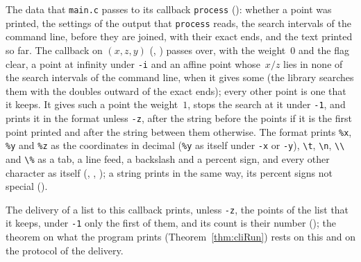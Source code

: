 \begin{definition}\label{def:cliProcess}
  \leanok
  The data that \verb|main.c| passes to its callback \verb|process| ():
  whether a point was printed, the settings of the output that \verb|process| reads, the search
  intervals of the command line, before they are joined, with their exact ends, and the text printed
  so far. The callback on $(x, z, y)$ (, )
  passes over, with the weight~$0$ and the flag clear, a point at infinity under \verb|-i| and an
  affine point whose~$x/z$ lies in none of the search intervals of the command line, when it gives
  some (the library searches them with the doubles outward of the exact ends); every other point is
  one that it keeps. It gives such a point the weight~$1$, stops the search at it under \verb|-1|,
  and prints it in the format unless \verb|-z|, after the string before the points if it is the
  first point printed and after the string between them otherwise. The format prints \verb|%x|,
  \verb|%y| and \verb|%z| as the coordinates in decimal (\verb|%y| as itself under \verb|-x| or
  \verb|-y|), \verb|\t|, \verb|\n|, \verb|\\| and \verb|\%| as a tab, a line feed, a backslash and a
  percent sign, and every other character as itself (,
  , ); a string prints in the same way, its
  percent signs not special ().
\end{definition}

The delivery of a list to this callback prints, unless \verb|-z|, the points of the list that it
keeps, under \verb|-1| only the first of them, and its count is their number
(); the theorem on what the program prints
(Theorem~\ref{thm:cliRun}) rests on this and on the protocol of the delivery.

